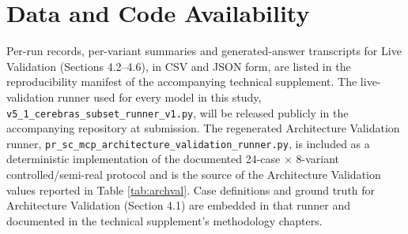 \section*{Data and Code Availability}

\begin{sloppypar}
Per-run records, per-variant summaries and generated-answer transcripts for Live Validation (Sections 4.2--4.6), in CSV and JSON form, are listed in the reproducibility manifest of the accompanying technical supplement. The live-validation runner used for every model in this study, \texttt{v5\_1\allowbreak\_cerebras\allowbreak\_subset\allowbreak\_runner\allowbreak\_v1.py}, will be released publicly in the accompanying repository at submission. The regenerated Architecture Validation runner, \texttt{pr\_sc\allowbreak\_mcp\allowbreak\_architecture\allowbreak\_validation\allowbreak\_runner.py}, is included as a deterministic implementation of the documented 24-case $\times$ 8-variant controlled/semi-real protocol and is the source of the Architecture Validation values reported in Table \ref{tab:archval}. Case definitions and ground truth for Architecture Validation (Section 4.1) are embedded in that runner and documented in the technical supplement's methodology chapters.
\end{sloppypar}
